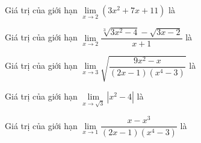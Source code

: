 
\begin{ex}%
	Giá trị của giới hạn $\lim\limits_{x\to  2}(3x^2+7x+11)$ là
\end{ex}

\begin{ex}%
	Giá trị của giới hạn  $\lim\limits_{x\to 2}\dfrac{\sqrt[3]{3x^2-4}-\sqrt{3x-2}}{x+1}$ là
\end{ex}

\begin{ex}%
	Giá trị của giới  hạn $\lim\limits_{x\to 3}\sqrt{\dfrac{9x^2-x}{(2x-1)(x^4-3)}}$ là
\end{ex}

\begin{ex}%
	Giá trị của giới hạn $\lim\limits_{x\to\sqrt 3}\left|x^2-4\right|$  là
\end{ex}

\begin{ex}%
	Giá trị của giới hạn $\lim\limits_{x\to 1}\dfrac{x-x^3}{\left(2x-1\right)\left(x^4-3\right)}$  là
\end{ex}

